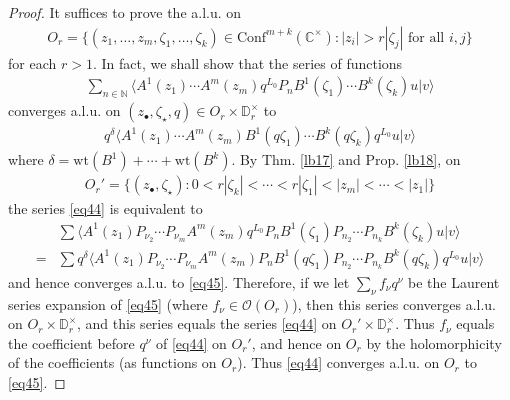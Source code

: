 \documentclass[12pt,b5paper,notitlepage]{article}
\theoremstyle{definition}
\newtheorem{rem}[df]{Remark}
\theoremstyle{plain}
\newcommand{\Conf}{\mathrm{Conf}}
\newcommand{\bk}[1]{\langle {#1}\rangle}
\newcommand{\scr}{\mathscr}
\newcommand{\blt}{\bullet}
\newcommand{\Cbb}{\mathbb C}
\newcommand{\Nbb}{\mathbb N}
\newcommand{\Pbb}{\mathbb P}
\newcommand{\Dbb}{\mathbb D}
\newcommand{\wt}{\mathrm{wt}}
\numberwithin{equation}{section}
\begin{document}
\begin{proof}
It suffices to prove the a.l.u. on
\begin{align*}
O_r=\{(z_1,\dots,z_m,\zeta_1,\dots,\zeta_k)\in\Conf^{m+k}(\Cbb^{\times}):|z_i|>r|\zeta_j|\text{ for all }i,j\}
\end{align*}
for each $r>1$. In fact, we shall show that the series of functions
\begin{align*}
\sum_{n\in\Nbb} \bk{A^1(z_1)\cdots A^m(z_m)q^{L_0}P_nB^1(\zeta_1)\cdots B^k(\zeta_k)u|v}  \tag{a}\label{eq44}
\end{align*}
converges a.l.u. on $(z_\blt,\zeta_\star,q)\in O_r\times \Dbb_r^\times$ to
\begin{align*}
q^\delta\bk{A^1(z_1)\cdots A^m(z_m)B^1(q\zeta_1)\cdots B^k(q\zeta_k)q^{L_0}u|v}  \tag{b}\label{eq45}
\end{align*}
where $\delta=\wt(B^1)+\cdots+\wt(B^k)$. By Thm. \ref{lb17} and Prop. \ref{lb18}, on
\begin{align*}
O_r'=\{(z_\blt,\zeta_\star):0<r|\zeta_k|<\cdots<r|\zeta_1|<|z_m|<\cdots<|z_1|\}
\end{align*}
the series \eqref{eq44} is equivalent to
\begin{align*}
&\sum \bk{A^1(z_1)P_{\nu_2}\cdots P_{\nu_m}A^m(z_m)q^{L_0}P_nB^1(\zeta_1)P_{n_2}\cdots P_{n_k}B^k(\zeta_k)u|v}\\
=&\sum q^\delta\bk{A^1(z_1)P_{\nu_2}\cdots P_{\nu_m}A^m(z_m)P_nB^1(q\zeta_1)P_{n_2}\cdots P_{n_k}B^k(q\zeta_k)q^{L_0}u|v}
\end{align*}
and hence converges a.l.u. to \eqref{eq45}. Therefore, if we let $\sum_\nu f_\nu q^\nu$ be the Laurent series expansion of \eqref{eq45} (where $f_\nu\in\scr O(O_r)$), then this series converges a.l.u. on $O_r\times\Dbb_r^\times$, and this series equals the series \eqref{eq44} on $O_r'\times\Dbb_r^\times$. Thus $f_\nu$ equals the coefficient before $q^\nu$ of \eqref{eq44} on $O_r'$, and hence on $O_r$ by the holomorphicity of the coefficients (as functions on $O_r$). Thus \eqref{eq44} converges a.l.u. on $O_r$ to \eqref{eq45}.
\end{proof}

\begin{comment}
\begin{rem}
In Thm. \ref{lb22}, assume more over that $u$ is vacuum to $B^1,\dots,B^k$, and $v$ is vacuum to $(A^1)^\theta,\dots,(A^k)^\theta$. Let
\begin{align*}
\Gamma=\{(z_\blt,\zeta_\star)\in \Conf^{m+k}(\Pbb^1):z_i\neq0,\zeta_j\neq \infty\text{ for all }i,j\}
\end{align*}
Then by the proof of Thm. \ref{lb17}, one sees that the holomorphic function
\begin{gather*}
(z_\blt,\zeta_\star)\in\Conf^{m+k}(\Cbb^\times)\mapsto\\ (-z_1^2)^{\wt(A^1)}\cdots(-z_m^2)^{\wt(A^m)}\bk{A^1(z_1)\cdots A^m(z_m)B^1(\zeta_1)\cdots B^k(\zeta_k)u|v}
\end{gather*}
can be extended to a holomorphic function on $\Gamma$. 
\end{rem}
\end{comment}
\end{document}

